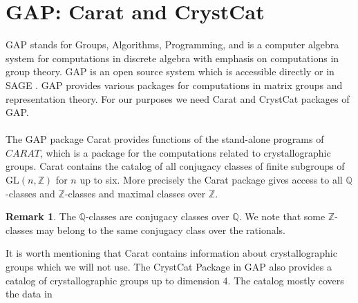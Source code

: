 \documentclass[a4paper, 14pt]{extarticle}
\theoremstyle{plain}
\theoremstyle{definition}
\newtheorem*{remark}{Remark}
\newcommand{\Z}{\ensuremath{\mathbb{Z}}}
\newcommand{\Q}{\ensuremath{\mathbb{Q}}}
\begin{document}
\section{GAP: Carat and CrystCat}
GAP \cite{GAP4} stands for Groups, Algorithms, Programming, and is a computer 
algebra system for computations in discrete algebra with emphasis on computations 
in group theory. GAP is an open source system which is accessible directly or 
in SAGE \cite{sagemath}. GAP provides various packages for computations in matrix 
groups and representation theory. For our purposes we need Carat and CrystCat packages of GAP.\\
\\
The GAP package Carat provides functions of the stand-alone programs of $CARAT$, 
which is a package for the computations related to crystallographic groups. Carat 
contains the catalog of all conjugacy classes of finite subgroups of $\mathrm{GL}(n,\Z)$ 
for $n$ up to six. More precisely the Carat package gives access to all 
$\Q$-classes and $\Z$-classes and maximal classes over $\Z$.  
\begin{remark}
The $\Q$-classes are conjugacy classes over $\Q$. We note that some $\Z$-classes 
may belong to the same conjugacy class over the rationals.
\end{remark}
It is worth mentioning that Carat contains information about crystallographic groups 
which we will not use. The CrystCat Package in GAP also provides a catalog of 
crystallographic groups up to dimension 4. The catalog mostly covers the data in 
\end{document}
